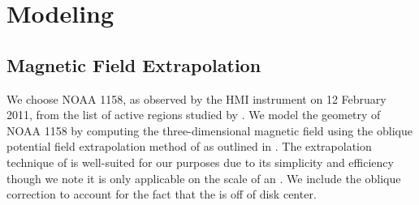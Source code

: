 \section{Modeling}\label{modeling}

\subsection{Magnetic Field Extrapolation}\label{field}

We choose \AR{} NOAA 1158, as observed by the HMI instrument \citet{hoeksema_helioseismic_2014} on 12 February 2011, from the list of active regions studied by \citet{warren_systematic_2012}. We model the geometry of \AR{} NOAA 1158 by computing the three-dimensional magnetic field using the oblique potential field extrapolation method of \citet{schmidt_observable_1964} as outlined in \citet[section 3]{sakurai_greens_1982}. The extrapolation technique of \citeauthor{schmidt_observable_1964} is well-suited for our purposes due to its simplicity and efficiency though we note it is only applicable on the scale of an \AR{}. We include the oblique correction to account for the fact that the \AR{} is off of disk center.

